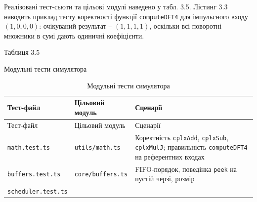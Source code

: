\documentclass[
]{article}
\newcommand{\passthrough}[1]{#1}
\begin{document}
Реалізовані тест-сьюти та цільові модулі наведено у табл. 3.5. Лістинг
3.3 наводить приклад тесту коректності функції
\passthrough{\lstinline!computeDFT!}\passthrough{\lstinline!4!} для
імпульсного входу \((1,0,0,0)\): очікуваний результат -- \((1,1,1,1)\),
оскільки всі поворотні множники в сумі дають одиничні коефіцієнти.

Таблиця 3.5

Модульні тести симулятора

\begin{longtable}[]{@{}
  >{\raggedright\arraybackslash}p{}
  >{\raggedright\arraybackslash}p{}
  >{\raggedright\arraybackslash}p{}@{}}
\caption[Модульні тести симулятора]{Модульні тести
симулятора}\tabularnewline
\toprule\noalign{}
\begin{minipage}[b]{\linewidth}\raggedright
Тест-файл
\end{minipage} & \begin{minipage}[b]{\linewidth}\raggedright
Цільовий модуль
\end{minipage} & \begin{minipage}[b]{\linewidth}\raggedright
Сценарії
\end{minipage} \\
\midrule\noalign{}
\endfirsthead
\toprule\noalign{}
\begin{minipage}[b]{\linewidth}\raggedright
Тест-файл
\end{minipage} & \begin{minipage}[b]{\linewidth}\raggedright
Цільовий модуль
\end{minipage} & \begin{minipage}[b]{\linewidth}\raggedright
Сценарії
\end{minipage} \\
\midrule\noalign{}
\endhead
\bottomrule\noalign{}
\endlastfoot
\passthrough{\lstinline!math.test.ts!} &
\passthrough{\lstinline!utils/!}\passthrough{\lstinline!math.ts!} &
Коректність \passthrough{\lstinline!cplxAdd!},
\passthrough{\lstinline!cplxSub!}, \passthrough{\lstinline!cplxMulJ!};
правильність \passthrough{\lstinline!computeDFT4!} на референтних
входах \\
\passthrough{\lstinline!buffers.test.ts!} &
\passthrough{\lstinline!core/!}\passthrough{\lstinline!buffers.ts!} &
FIFO-порядок, поведінка \passthrough{\lstinline!peek!} на пустій черзі,
розмір \\
\passthrough{\lstinline!scheduler.test.ts!} &

\end{longtable}
\end{document}
